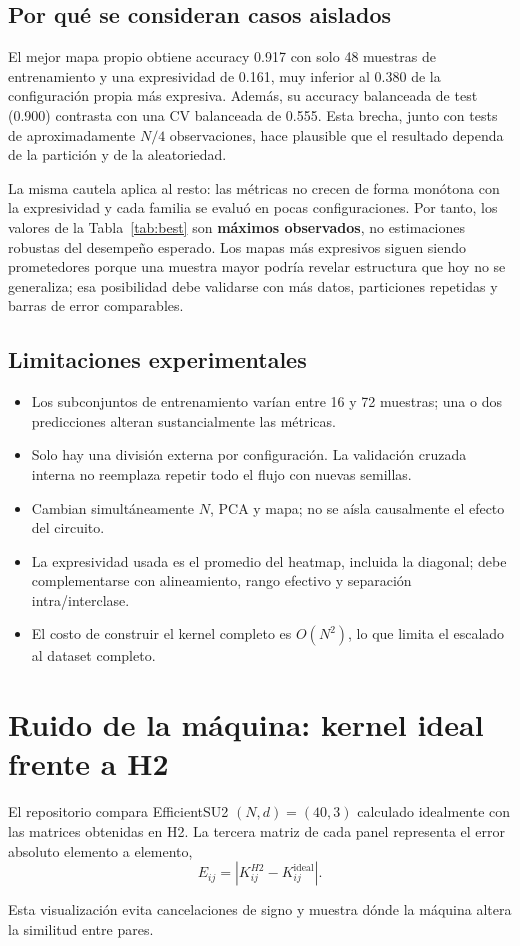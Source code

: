 \documentclass[9pt,a4paper]{extarticle}
\begin{document}
\subsection{Por qué se consideran casos aislados}
El mejor mapa propio obtiene accuracy 0.917 con solo 48 muestras de entrenamiento y una expresividad de 0.161, muy inferior al 0.380 de la configuración propia más expresiva. Además, su accuracy balanceada de test (0.900) contrasta con una CV balanceada de 0.555. Esta brecha, junto con tests de aproximadamente $N/4$ observaciones, hace plausible que el resultado dependa de la partición y de la aleatoriedad.

La misma cautela aplica al resto: las métricas no crecen de forma monótona con la expresividad y cada familia se evaluó en pocas configuraciones. Por tanto, los valores de la Tabla~\ref{tab:best} son \textbf{máximos observados}, no estimaciones robustas del desempeño esperado. Los mapas más expresivos siguen siendo prometedores porque una muestra mayor podría revelar estructura que hoy no se generaliza; esa posibilidad debe validarse con más datos, particiones repetidas y barras de error comparables.

\subsection{Limitaciones experimentales}
\begin{itemize}
  \item Los subconjuntos de entrenamiento varían entre 16 y 72 muestras; una o dos predicciones alteran sustancialmente las métricas.
  \item Solo hay una división externa por configuración. La validación cruzada interna no reemplaza repetir todo el flujo con nuevas semillas.
  \item Cambian simultáneamente $N$, PCA y mapa; no se aísla causalmente el efecto del circuito.
  \item La expresividad usada es el promedio del heatmap, incluida la diagonal; debe complementarse con alineamiento, rango efectivo y separación intra/interclase.
  \item El costo de construir el kernel completo es $O(N^2)$, lo que limita el escalado al dataset completo.
\end{itemize}

\clearpage
\section{Ruido de la máquina: kernel ideal frente a H2}
El repositorio compara EfficientSU2 $(N,d)=(40,3)$ calculado idealmente con las matrices obtenidas en H2. La tercera matriz de cada panel representa el error absoluto elemento a elemento,
\begin{equation}
E_{ij}=\left|K^{H2}_{ij}-K^{\mathrm{ideal}}_{ij}\right|.
\end{equation}
\par\noindent Esta visualización evita cancelaciones de signo y muestra dónde la máquina altera la similitud entre pares.
\end{document}
